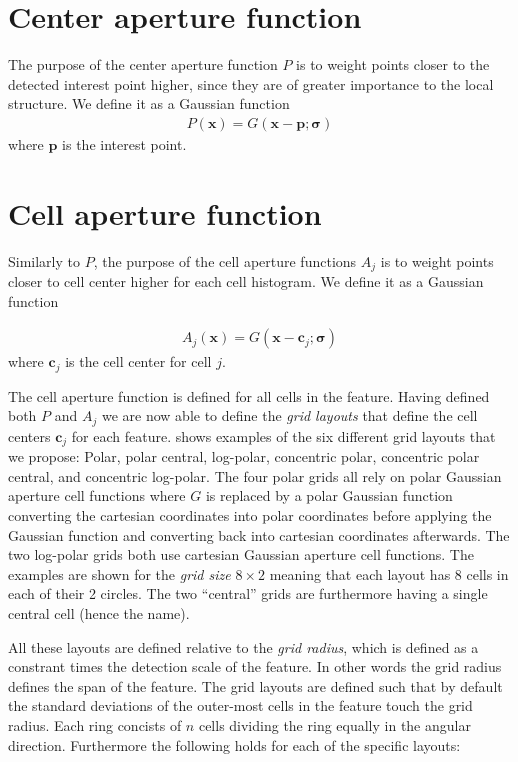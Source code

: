 \documentclass[thesis.tex]{subfiles}
\def\x{\mathbf{x}}
\def\p{\mathbf{p}}
\def\c{\mathbf{c}}
\begin{document}
\section{Center aperture function}
%
The purpose of the center aperture function $P$ is to weight points closer to the detected interest point higher, since they are of greater importance to the local structure. We define it as a Gaussian function
%
\begin{align}
P(\x) = G(\x - \p; \boldsymbol{\sigma})
\end{align}
%
where $\p$ is the interest point.
%
\section{Cell aperture function}
%
Similarly to $P$, the purpose of the cell aperture functions $A_j$ is to weight points closer to cell center higher for each cell histogram. We define it as a Gaussian function

%
\begin{align}
A_j(\x) = G(\x - \c_j; \boldsymbol{\sigma})
\end{align}
%
where $\c_j$ is the cell center for cell $j$.

The cell aperture function is defined for all cells in the feature. Having defined both $P$ and $A_j$ we are now able to define the \emph{grid layouts} that define the cell centers $\boldsymbol{c}_j$ for each feature.
 shows examples of the six different grid layouts that we propose: Polar, polar central, log-polar, concentric polar, concentric polar central, and concentric log-polar. The four polar grids all rely on polar Gaussian aperture cell functions where $G$ is replaced by a polar Gaussian function converting the cartesian coordinates into polar coordinates before applying the Gaussian function and converting back into cartesian coordinates afterwards. The two log-polar grids both use cartesian Gaussian aperture cell functions. The examples are shown for the \emph{grid size} $8\times 2$ meaning that each layout has 8 cells in each of their 2 circles. The two ``central'' grids are furthermore having a single central cell (hence the name).

All these layouts are defined relative to the \emph{grid radius}, which is defined as a constrant times the detection scale of the feature. In other words the grid radius defines the span of the feature. The grid layouts are defined such that by default the standard deviations of the outer-most cells in the feature touch the grid radius. Each ring concists of $n$ cells dividing the ring equally in the angular direction. Furthermore the following holds for each of the specific layouts:
\end{document}
